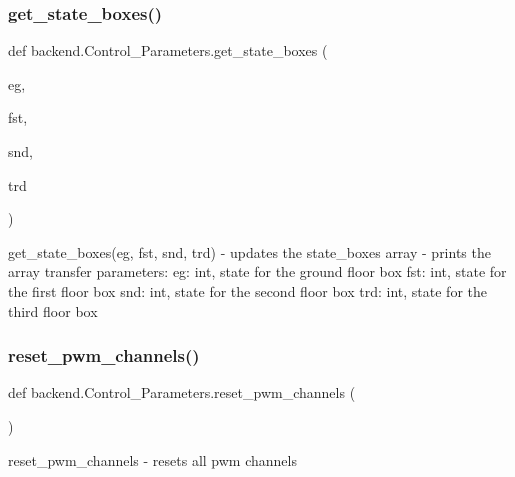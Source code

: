 \subsubsection{\texorpdfstring{get\+\_\+state\+\_\+boxes()}{get\_state\_boxes()}}
{\footnotesize\ttfamily def backend.\+Control\+\_\+\+Parameters.\+get\+\_\+state\+\_\+boxes (\begin{DoxyParamCaption}\item[{}]{eg,  }\item[{}]{fst,  }\item[{}]{snd,  }\item[{}]{trd }\end{DoxyParamCaption})}

\begin{DoxyVerb}get_state_boxes(eg, fst, snd, trd)
    - updates the state_boxes array
    - prints the array
transfer parameters:
    eg:  int, state for the ground floor box
    fst: int, state for the first floor box
    snd: int, state for the second floor box
    trd: int, state for the third floor box
\end{DoxyVerb}
 \mbox{\label{classbackend_1_1Control__Parameters_a73190d45c0f933d9eb703545125d8d43_a73190d45c0f933d9eb703545125d8d43}} 
\subsubsection{\texorpdfstring{reset\+\_\+pwm\+\_\+channels()}{reset\_pwm\_channels()}}
{\footnotesize\ttfamily def backend.\+Control\+\_\+\+Parameters.\+reset\+\_\+pwm\+\_\+channels (\begin{DoxyParamCaption}{ }\end{DoxyParamCaption})}

\begin{DoxyVerb}reset_pwm_channels
    - resets all pwm channels
\end{DoxyVerb}
 \mbox{\label{classbackend_1_1Control__Parameters_a41031342b9072faa0e6b236e9e106694_a41031342b9072faa0e6b236e9e106694}} 
